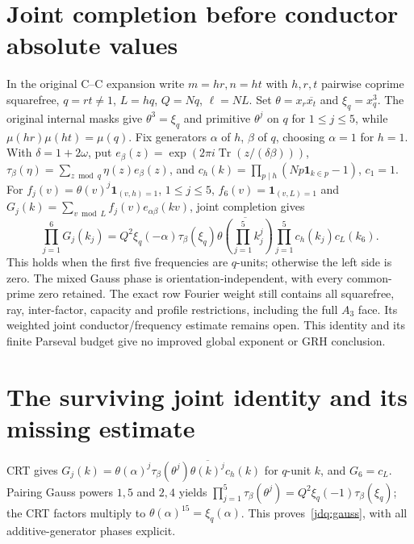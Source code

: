 \documentclass[11pt,oneside,openany]{book}
\theoremstyle{definition}\newtheorem{definition}[theorem]{Definition}
\theoremstyle{remark}\newtheorem{remark}[theorem]{Remark}
\begin{document}
\section{Joint completion before conductor absolute values}\label{jdq:core}
In the original C--C expansion write $m=hr,n=ht$ with $h,r,t$
pairwise coprime squarefree, $q=rt\ne1$, $L=hq$, $Q=Nq$, $\ell=NL$.
Set $\theta=x_r\overline{x_t}$ and $\xi_q=x_q^3$.
The original internal masks give $\theta^3=\xi_q$ and primitive
$\theta^j$ on $q$ for $1\le j\le5$, while
$\mu(hr)\mu(ht)=\mu(q)$. Fix generators $\alpha$ of $h$, $\beta$ of
$q$, choosing $\alpha=1$ for $h=1$. With $\delta=1+2\omega$, put
$e_\beta(z)=\exp(2\pi i\operatorname{Tr}(z/(\delta\beta)))$,
$\tau_\beta(\eta)=\sum_{z\bmod q}\eta(z)e_\beta(z)$, and
$c_h(k)=\prod_{p\mid h}(Np\mathbf1_{k\in p}-1)$, $c_1=1$.
For $f_j(v)=\theta(v)^j\mathbf1_{(v,h)=1}$, $1\le j\le5$,
$f_6(v)=\mathbf1_{(v,L)=1}$ and
$G_j(k)=\sum_{v\bmod L}f_j(v)e_{\alpha\beta}(kv)$, joint completion gives
\begin{equation}\label{jdq:gauss}
 \prod_{j=1}^6G_j(k_j)=Q^2\xi_q(-\alpha)\tau_\beta(\xi_q)
 \overline{\theta(\prod_{j=1}^5k_j^j)}
 \prod_{j=1}^5c_h(k_j)c_L(k_6).
\end{equation}
This holds when the first five frequencies are $q$-units; otherwise
the left side is zero. The mixed Gauss phase is orientation-independent,
with every common-prime zero retained. The exact row Fourier weight
still contains all squarefree, ray, inter-factor, capacity and profile
restrictions, including the full $A_3$ face. Its weighted joint
conductor/frequency estimate remains open. This identity and its finite
Parseval budget give no improved global exponent or GRH conclusion.

\section{The surviving joint identity and its missing estimate}\label{jdq:details}
CRT gives $G_j(k)=\theta(\alpha)^j\tau_\beta(\theta^j)
\overline{\theta(k)^j}c_h(k)$ for $q$-unit $k$, and $G_6=c_L$.
Pairing Gauss powers $1,5$ and $2,4$ yields
$\prod_{j=1}^5\tau_\beta(\theta^j)=Q^2\xi_q(-1)\tau_\beta(\xi_q)$;
the CRT factors multiply to $\theta(\alpha)^{15}=\xi_q(\alpha)$.
This proves~\eqref{jdq:gauss}, with all additive-generator phases explicit.
\end{document}
